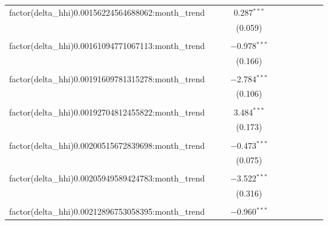 \begin{table}[H]
{\begin{tabular}{@{\extracolsep{5pt}}lccccccccc}
  factor(delta\_hhi)0.00156224564688062:month\_trend &  &  & 0.287$^{***}$ &  &  &  &  &  &  \\  

   &  &  & (0.059) &  &  &  &  &  &  \\  

   & & & & & & & & & \\  

  factor(delta\_hhi)0.00161094771067113:month\_trend &  &  & $-$0.978$^{***}$ &  &  &  &  &  &  \\  

   &  &  & (0.166) &  &  &  &  &  &  \\  

   & & & & & & & & & \\  

  factor(delta\_hhi)0.00191609781315278:month\_trend &  &  & $-$2.784$^{***}$ &  &  &  &  &  &  \\  

   &  &  & (0.106) &  &  &  &  &  &  \\  

   & & & & & & & & & \\  

  factor(delta\_hhi)0.00192704812455822:month\_trend &  &  & 3.484$^{***}$ &  &  &  &  &  &  \\  

   &  &  & (0.173) &  &  &  &  &  &  \\  

   & & & & & & & & & \\  

  factor(delta\_hhi)0.00200515672839698:month\_trend &  &  & $-$0.473$^{***}$ &  &  &  &  &  &  \\  

   &  &  & (0.075) &  &  &  &  &  &  \\  

   & & & & & & & & & \\  

  factor(delta\_hhi)0.00205949589424783:month\_trend &  &  & $-$3.522$^{***}$ &  &  &  &  &  &  \\  

   &  &  & (0.316) &  &  &  &  &  &  \\  

   & & & & & & & & & \\  

  factor(delta\_hhi)0.00212896753058395:month\_trend &  &  & $-$0.960$^{***}$ &  &  &  &  &  &  \\  


\end{tabular}}
\end{table}
